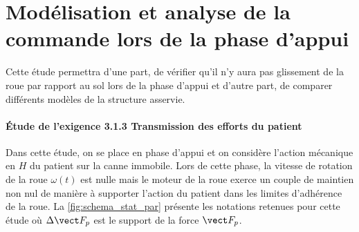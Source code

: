 \ifprof
\else
\newpage
\section{Modélisation et analyse de la commande lors de la phase d'appui}

Cette étude permettra d'une part, de vérifier qu'il n'y aura pas glissement de la roue par rapport au sol lors de la phase d'appui et d'autre part, de comparer différents modèles de la structure asservie.

\paragraph{Étude de l'exigence 3.1.3 \og Transmission des efforts du patient\fg{}}

% 

Dans cette étude, on se place en phase d'appui et on considère l'action mécanique en $H$ du patient sur la canne immobile.
Lors de cette phase, la vitesse de rotation de la roue $\omega(t)$ est nulle mais le moteur de la roue exerce un couple de maintien non nul de manière à supporter l'action du patient dans les limites d'adhérence de la roue. La \ref{fig:schema_stat_par} présente les notations retenues pour cette étude où $\Delta \vect F_p$ est le support de la force $\vect F_p$. 

